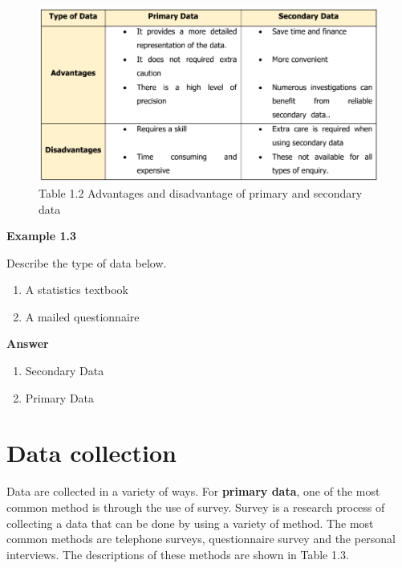 \documentclass[
  a4paper,
  DIV=11,
  numbers=noendperiod,
  oneside]{scrreprt}
\providecommand{\tightlist}{%
  \setlength{\itemsep}{0pt}\setlength{\parskip}{0pt}}\usepackage{longtable,booktabs,array}
\begin{document}
\begin{figure}

{\centering \includegraphics[width=5.20833in,height=\textheight]{images/ch1/Picture6.png}

}

\caption{Table 1.2 Advantages and disadvantage of primary and secondary
data}

\end{figure}

{\textbf{Example 1.3}}

Describe the type of data below.

\begin{enumerate}
\def\labelenumi{\alph{enumi})}
\tightlist
\item
  A statistics textbook
\item
  A mailed questionnaire
\end{enumerate}

{\textbf{Answer}}

\begin{enumerate}
\def\labelenumi{\alph{enumi})}
\tightlist
\item
  Secondary Data
\item
  Primary Data
\end{enumerate}

\hypertarget{data-collection}{%
\section{Data collection}\label{data-collection}}

Data are collected in a variety of ways. For \textbf{primary data}, one
of the most common method is through the use of survey. Survey is a
research process of collecting a data that can be done by using a
variety of method. The most common methods are telephone surveys,
questionnaire survey and the personal interviews. The descriptions of
these methods are shown in Table 1.3.
\end{document}
